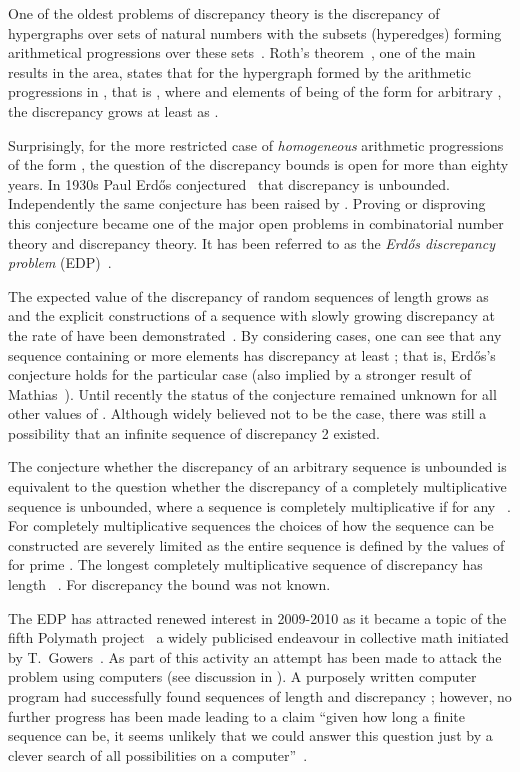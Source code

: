 \documentclass{article} \usepackage[utf8]{inputenc}
\begin{document}
One of the oldest problems of discrepancy theory is the 
discrepancy of hypergraphs over sets of natural numbers with the  subsets
(hyperedges) forming arithmetical progressions over these sets~\cite{MS96}. 
 Roth's theorem~\cite{Roth64}, one of the main results in the area, states that
for the hypergraph formed by the arithmetic progressions in , that is
, where  and
elements of  being of the form  for arbitrary ,
the discrepancy grows at least as .

\vspace*{1pt}

Surprisingly, for the more restricted case of \emph{homogeneous} arithmetic progressions of the form
, the question of the discrepancy bounds is open for more than eighty years.   
In 1930s Paul Erd\H{o}s conjectured~\cite{Unsolved} that
discrepancy is unbounded. Independently the same conjecture has been raised by 
\cite{chudakov}.
Proving or  disproving this conjecture became one of the major open problems in
combinatorial number theory and discrepancy theory. It has been referred to as the
\emph{Erd\H{o}s discrepancy problem} (EDP)~\cite{Beck,BeckSos,NiTa}.


The  expected value of the discrepancy of 
random   sequences of length  grows as
 and the explicit constructions of a sequence with slowly growing
discrepancy at the rate of  have been demonstrated~\cite{gowers,BCC10}. 
By considering cases, one can see  that
any  sequence containing  or more elements has discrepancy at least ;
that
is, Erd\H{o}s's conjecture holds for the particular case  
(also implied by a stronger result of Mathias~). 
Until recently the status of the conjecture remained unknown for all other
values of .  Although widely believed not to be the case, there was still a
possibility that an infinite sequence of discrepancy 2 existed. 

The conjecture whether the discrepancy of an arbitrary  sequence is
unbounded is equivalent to the question whether the discrepancy of a completely
multiplicative  sequence is unbounded, where a sequence is completely
multiplicative if  for any ~\cite{Unsolved}.
For completely multiplicative sequences the choices of how the sequence can be
constructed are severely limited as the entire sequence is defined by the values of
 for prime . The longest completely multiplicative sequence of
discrepancy  has length ~\cite{Polymath2}.  For discrepancy  the
bound was not known.

The EDP has attracted renewed interest in 2009-2010  as it became a topic of the fifth
Poly\-math 
project~
a widely publicised endeavour in
collective math initiated by T.~Gowers~.   As part of this
activity  an attempt has been made
to attack the problem using computers (see discussion in \cite{Polymath}). A
purposely written computer program had successfully found  sequences of
length  and discrepancy ; however, no further progress has been made
leading to a claim ``given how long a finite sequence can
be, it seems unlikely that we could answer this question just by a clever
search of all possibilities on a computer''~\cite{Polymath}.
\end{document}

